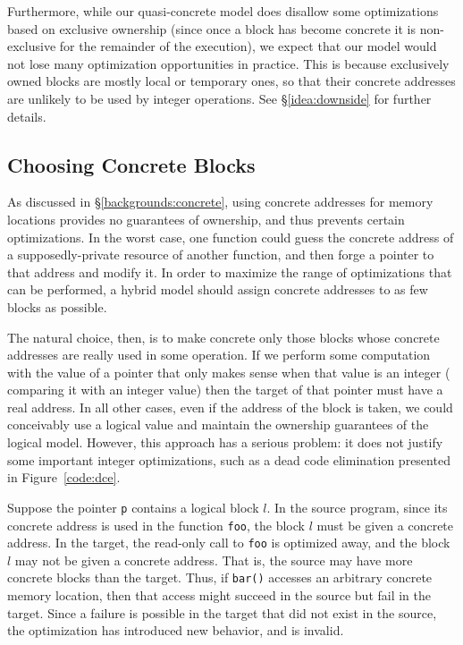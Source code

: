 Furthermore, while our quasi-concrete model does disallow some optimizations based on exclusive ownership (since once a block has become concrete it is non-exclusive for the remainder of the execution), we expect that our model would not lose many optimization
opportunities in practice. This is because exclusively owned blocks are mostly local or temporary ones,
  so that their concrete addresses are unlikely to be used by integer operations. See \S\ref{idea:downside} for further details.

\subsection{Choosing Concrete Blocks}
\label{idea:cast}
As discussed in \S\ref{backgrounds:concrete}, using concrete addresses for memory locations provides no guarantees of ownership, and thus prevents certain optimizations. In the worst case, one function could guess the concrete address of a supposedly-private resource of another function, and then forge a pointer to that address and modify it. In order to maximize the range of optimizations that can be performed, a hybrid model should assign concrete addresses to as few blocks as possible.

The natural choice, then, is to make concrete only those blocks whose concrete addresses are really used in some operation. If we perform some computation with the value of a pointer that only makes sense when that value is an integer (\eg %
comparing it with an integer value) then the target of that pointer must have a real address. In all other cases, even if the address of the block is taken, we could conceivably use a logical value and maintain the ownership guarantees of the logical model. However, this approach has a serious problem: it does not justify some important integer optimizations, such as a dead code elimination presented in Figure~\ref{code:dce}.

Suppose the pointer \texttt{p} contains a logical block $l$. In the source program, since its concrete address is used in the function
\texttt{foo}, the block $l$ must be given a concrete address. In the target, the read-only call to \texttt{foo} is optimized away, and the block $l$ may not be given a concrete address. That is, the source may have more concrete blocks than the target. Thus, if \texttt{bar()} accesses an arbitrary concrete memory location, then that access might succeed in the source but fail in the target. Since a failure is possible in the target that did not exist in the source, the optimization has introduced new behavior, and is invalid.

